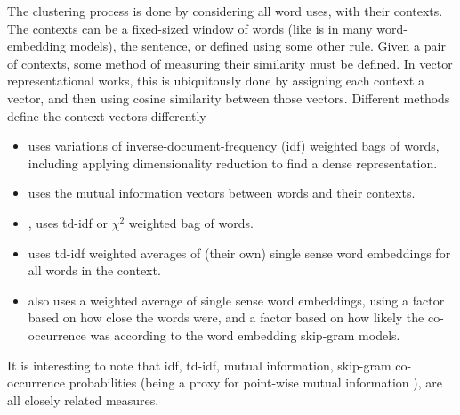 \documentclass[12pt,parskip]{komatufte}
\begin{document}
The clustering process is done by considering all word uses, with their contexts.
The contexts can be a fixed-sized window of words (like is in many word-embedding models), the sentence, or defined using some other rule.
Given a pair of contexts, some method of measuring their similarity must be defined.
In vector representational works, this is ubiquitously done by assigning each context a vector, and then using cosine similarity between those vectors.
Different methods define the context vectors differently
\begin{itemize}
\item \textcite{Schutze:1998wordsenseclustering} uses variations of inverse-document-frequency (idf) weighted bags of words, including applying dimensionality reduction to find a dense representation.
\item \textcite{pantel2002WSI} uses the mutual information vectors between words and their contexts.
\item \textcite{Reisinger2010}, uses td-idf or $\chi^2$ weighted bag of words.
\item {} uses td-idf weighted averages of (their own) single sense word embeddings for all words in the context.
\item  {} also uses a weighted average of single sense word embeddings, using a factor based on how close the words were, and a factor based on how likely the co-occurrence was according to the word embedding skip-gram models.

\end{itemize}
It is interesting to note that idf, td-idf, mutual information, skip-gram co-occurrence probabilities (being a proxy for point-wise mutual information \parencite{levy2014neural}), are all closely related measures.
\end{document}

